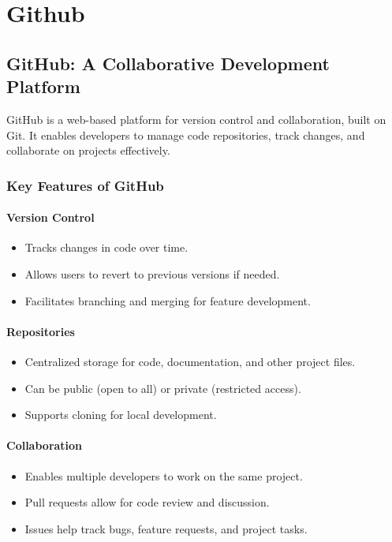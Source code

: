 \documentclass[openany]{book} %
\begin{document}
\part {Github}

\chapter{GitHub: A Collaborative Development Platform}

GitHub is a web-based platform for version control and collaboration, built on Git. It enables developers to manage code repositories, track changes, and collaborate on projects effectively.

\section{Key Features of GitHub}

\subsection{Version Control}
\begin{itemize}
    \item Tracks changes in code over time.
    \item Allows users to revert to previous versions if needed.
    \item Facilitates branching and merging for feature development.
\end{itemize}

\subsection{Repositories}
\begin{itemize}
    \item Centralized storage for code, documentation, and other project files.
    \item Can be public (open to all) or private (restricted access).
    \item Supports cloning for local development.
\end{itemize}

\subsection{Collaboration}
\begin{itemize}
    \item Enables multiple developers to work on the same project.
    \item Pull requests allow for code review and discussion.
    \item Issues help track bugs, feature requests, and project tasks.
\end{itemize}
\end{document}
